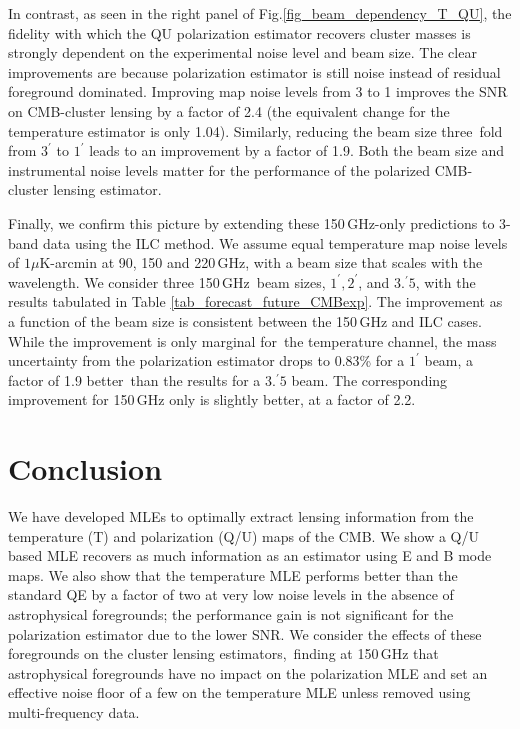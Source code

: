In contrast, as seen in the right panel of Fig.\ref{fig_beam_dependency_T_QU}, the fidelity with which the QU polarization estimator recovers cluster masses is strongly dependent on the experimental noise level and beam size. The clear improvements are because polarization estimator is still noise instead of residual foreground dominated. Improving map noise levels from 3 to 1 \ukarcmin{} improves the SNR on CMB-cluster lensing by a factor of 2.4 (the equivalent change for the temperature estimator is only 1.04). Similarly, reducing the beam size three\
fold from $3^\prime$ to $1^\prime$ leads to an improvement by a factor of 1.9. Both the beam size and instrumental noise levels matter for the performance of the polarized CMB-cluster lensing estimator.

Finally, we confirm this picture by extending these 150\,GHz-only predictions to 3-band data using the ILC method. We assume equal temperature map noise levels of $1 \mu$K-arcmin at 90, 150 and 220\,GHz, with a beam size that scales with the wavelength. We consider three 150\,GHz\
 beam sizes, $1^\prime, 2^\prime$, and $3.^\prime 5$, with the results  tabulated in Table \ref{tab_forecast_future_CMBexp}.
The improvement  as a function of the beam size is consistent between the 150\,GHz and ILC cases. While the improvement is only marginal for\
 the temperature channel, the mass uncertainty from the polarization estimator drops to 0.83\% for a $1^\prime$ beam, a factor of 1.9 better\
 than the results for a $3.^\prime5$ beam. The corresponding improvement for 150\,GHz only is slightly better, at a factor of 2.2.
 
 \section{Conclusion}
\label{sec_conclusion}
We have developed MLEs to optimally extract lensing information from the temperature (T) and polarization (Q/U) maps of the CMB. We show a Q/U based MLE recovers as much information as an estimator using E and B mode maps. We also show that the temperature MLE performs better than the standard QE by a factor of two at very low noise levels in the absence of astrophysical foregrounds; the performance gain is not significant for the polarization estimator due to the lower SNR. We consider the effects of these foregrounds on the cluster lensing estimators,\
 finding at 150\,GHz that  astrophysical foregrounds have no impact on the polarization MLE and set an effective noise floor of a few \ukarcmin{} on the temperature MLE unless removed using multi-frequency data.

